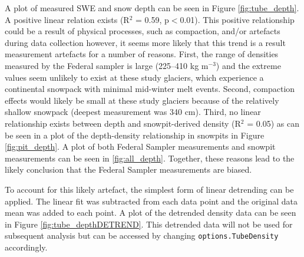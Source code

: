 \documentclass[12pt]{article}
\begin{document}
A plot of measured SWE and snow depth can be seen in Figure \ref{fig:tube_depth}. A positive linear relation exists (R$^2$ = 0.59, p$<$0.01). This positive relationship could be a result of physical processes, such as compaction, and/or artefacts during data collection however, it seems more likely that this trend is a result measurement artefacts for a number of reasons. First, the range of densities measured by the Federal sampler is large (225--410 kg m$^{-3}$) and the extreme values seem unlikely to exist at these study glaciers, which experience a continental snowpack with minimal mid-winter melt events. Second, compaction effects would likely be small at these study glaciers because of the relatively shallow snowpack (deepest measurement was 340 cm). Third, no linear relationship exists between depth and snowpit-derived density (R$^2$ = 0.05) as can be seen in a plot of the depth-density relationship in snowpits in Figure \ref{fig:pit_depth}. A plot of both Federal Sampler measurements and snowpit measurements can be seen in \ref{fig:all_depth}. Together, these reasons lead to the likely conclusion that the Federal Sampler measurements are biased. 

To account for this likely artefact, the simplest form of linear detrending can be applied. The linear fit was subtracted from each data point and the original data mean was added to each point. A plot of the detrended density data can be seen in Figure \ref{fig:tube_depthDETREND}. This detrended data will not be used for subsequent analysis but can be accessed by changing \texttt{options.TubeDensity} accordingly. 
\end{document}
